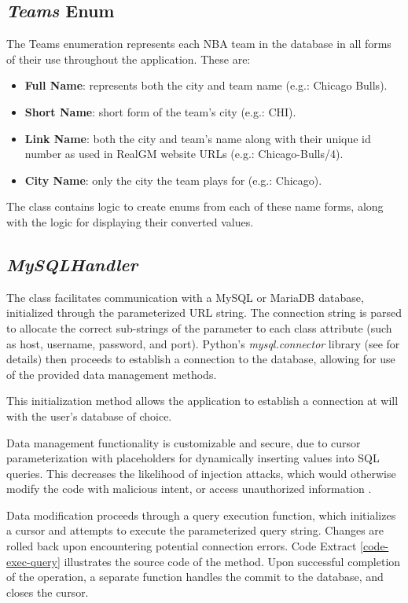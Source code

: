 \documentclass{thesis-ekf}
\theoremstyle{definition}
\theoremstyle{remark}
\begin{document}
\subsection{\emph{Teams} Enum}
The Teams enumeration represents each NBA team in the database in all forms of their use throughout the application. These are:
\begin{itemize}
	\item \textbf{Full Name}: represents both the city and team name (e.g.: Chicago Bulls).
	\item \textbf{Short Name}: short form of the team's city (e.g.: CHI).
	\item \textbf{Link Name}: both the city and team's name along with their unique id number as used in RealGM website URLs (e.g.: Chicago-Bulls/4).
	\item \textbf{City Name}: only the city the team plays for (e.g.: Chicago).
\end{itemize} 
The class contains logic to create enums from each of these name forms, along with the logic for displaying their converted values.

\subsection{\emph{MySQLHandler}}
The class facilitates communication with a MySQL or MariaDB database, initialized through the parameterized URL string. The connection string is parsed to allocate the correct sub-strings of the parameter to each class attribute (such as host, username, password, and port). Python's \emph{mysql.connector} library (see \cite{mysql.conn} for details) then proceeds to establish a connection to the database, allowing for use of the provided data management methods.

This initialization method allows the application to establish a connection at will with the user's database of choice. 

Data management functionality is customizable and secure, due to cursor parameterization with placeholders for dynamically inserting values into SQL queries. This decreases the likelihood of injection attacks, which would otherwise modify the code with malicious intent, or access unauthorized information \cite{injection-attack}.

Data modification proceeds through a query execution function, which initializes a cursor and attempts to execute the parameterized query string. Changes are rolled back upon encountering potential connection errors. Code Extract \ref{code-exec-query} illustrates the source code of the method. Upon successful completion of the operation, a separate function handles the commit to the database, and closes the cursor.

\end{document}
